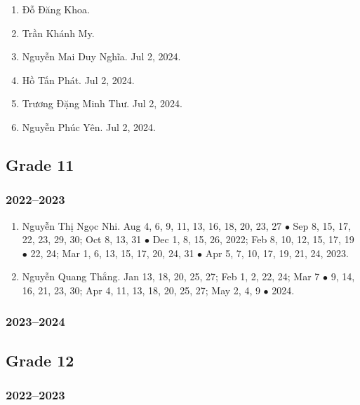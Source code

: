 \documentclass{article}
\begin{document}
\begin{enumerate}
	\item {\sc Đỗ Đăng Khoa.} 
	\item {\sc Trần Khánh My.}
	\item {\sc Nguyễn Mai Duy Nghĩa.} Jul 2, 2024.
	\item {\sc Hồ Tấn Phát.} Jul 2, 2024.
	\item {\sc Trương Đặng Minh Thư.} Jul 2, 2024.
	\item {\sc Nguyễn Phúc Yên.} Jul 2, 2024.
\end{enumerate}


\subsection{Grade 11}

\subsubsection{2022--2023}

\begin{enumerate}
	\item {\sc Nguyễn Thị Ngọc Nhi.} {\sf[In]} Aug 4, 6, 9, 11, 13, 16, 18, 20, 23, 27 $\bullet$ Sep 8, 15, 17, 22, 23, 29, 30; Oct 8, 13, 31 $\bullet$ Dec 1, 8,  15, 26, 2022; Feb 8, 10, 12, 15, 17, 19 $\bullet$ 22, 24; Mar 1, 6, 13, 15, 17, 20, 24, 31 $\bullet$ Apr 5, 7, 10, 17, 19, 21, 24, 2023. {\sf[Out]}
	\item {\sc Nguyễn Quang Thắng.} {\sf[In]} Jan 13, 18, 20, 25, 27; Feb 1, 2, 22, 24; Mar 7 $\bullet$ 9, 14, 16, 21, 23, 30; Apr 4, 11, 13, 18, 20, 25, 27; May 2, 4, 9 $\bullet$ 2024.
\end{enumerate}

\subsubsection{2023--2024}


\subsection{Grade 12}

\subsubsection{2022--2023}
\end{document}
